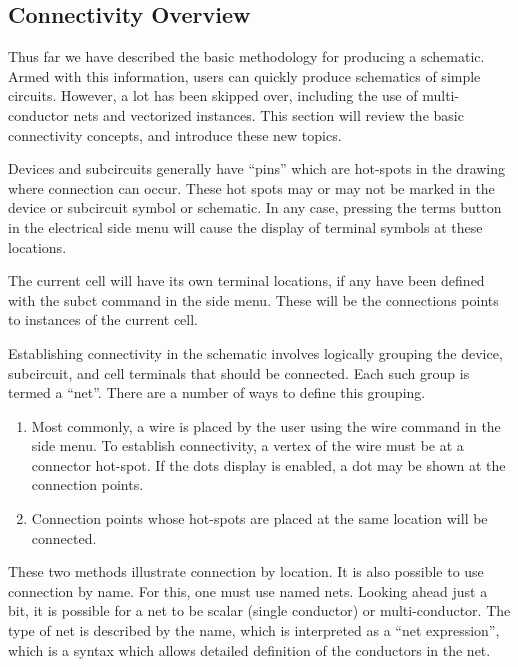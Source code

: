 \subsection{Connectivity Overview}
\label{connect}

Thus far we have described the basic methodology for producing a
schematic.  Armed with this information, users can quickly produce
schematics of simple circuits.  However, a lot has been skipped over,
including the use of multi-conductor nets and vectorized instances. 
This section will review the basic connectivity concepts, and
introduce these new topics.

Devices and subcircuits generally have ``pins'' which are hot-spots in
the drawing where connection can occur.  These hot spots may or may
not be marked in the device or subcircuit symbol or schematic.  In any
case, pressing the {\cb terms} button in the electrical side menu will
cause the display of terminal symbols at these locations.

The current cell will have its own terminal locations, if any have
been defined with the {\cb subct} command in the side menu.  These
will be the connections points to instances of the current cell.

Establishing connectivity in the schematic involves logically grouping
the device, subcircuit, and cell terminals that should be connected. 
Each such group is termed a ``net''.  There are a number of ways to
define this grouping.

\begin{enumerate}
\item{Most commonly, a wire is placed by the user using the {\cb wire}
command in the side menu.  To establish connectivity, a vertex of the
wire must be at a connector hot-spot.  If the {\cb dots} display is
enabled, a dot may be shown at the connection points.}

\item{Connection points whose hot-spots are placed at the same
location will be connected.}
\end{enumerate}

These two methods illustrate connection by location.  It is also
possible to use connection by name.  For this, one must use named
nets.  Looking ahead just a bit, it is possible for a net to be scalar
(single conductor) or multi-conductor.  The type of net is described
by the name, which is interpreted as a ``net expression'', which is a
syntax which allows detailed definition of the conductors in the net.

